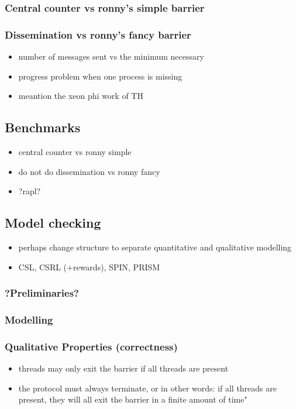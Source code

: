 \documentclass[a4paper, 10pt]{article}
\begin{document}
\subsubsection{Central counter vs ronny's simple barrier}
\subsubsection{Dissemination vs ronny's fancy barrier}
\begin{itemize}
	\item number of messages sent vs the minimum necessary
	\item progress problem when one process is missing
	\item meantion the xeon phi work of TH
\end{itemize}

\subsection{Benchmarks}
\begin{itemize}
	\item central counter vs ronny simple
	\item do not do dissemination vs ronny fancy
	\item ?rapl?
\end{itemize}

\subsection{Model checking}
\begin{itemize}
	\item perhaps change structure to separate quantitative and qualitative modelling
	\item CSL\cite{assb96}, CSRL\cite{bhhk00} (+rewards), SPIN\cite{spin}\cite{hol97}, PRISM\cite{prism}\cite{knp09}
\end{itemize}
\subsubsection{?Preliminaries?}
\subsubsection{Modelling} %
\subsubsection{Qualitative Properties (correctness)}
\begin{itemize}
	\item threads may only exit the barrier if all threads are present
	\item the protocol must always terminate, or in other words: if all threads are present, they will all exit the barrier in a finite amount of time"
\end{itemize}
\end{document}
